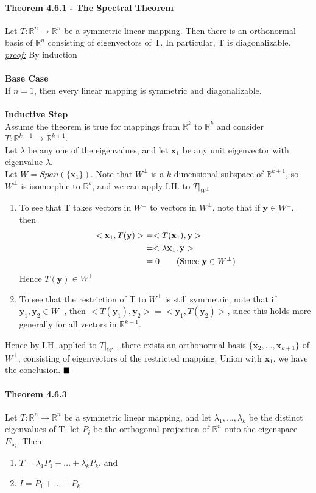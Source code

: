 \documentclass[11pt]{article}
\newcommand{\tb}[1]{\textbf{#1}}
\newcommand{\proof}[0]{\textit{\underline{proof:} }}
\newcommand{\qed}[0]{$\hfill\blacksquare$}
\newcommand{\real}[0]{\mathbb{R}}
\newcommand{\vx}[0]{\tb{x}}
\newcommand{\vy}[0]{\tb{y}}
\begin{document}
{\paragraph{Theorem 4.6.1 - The Spectral Theorem} Let $T: \real^n \rightarrow \real^n$ be a symmetric linear mapping. Then there is an orthonormal basis of $\real^n$ consisting of eigenvectors of T. In particular, T is diagonalizable.\\
\proof By induction\\\\
\tb{Base Case}\\
If $n=1$, then every linear mapping is symmetric and diagonalizable.\\\\
\tb{Inductive Step}\\
Assume the theorem is true for mappings from $\real^k$ to $\real^k$ and consider $T: \real^{k+1} \rightarrow \real^{k+1}$. \\
Let $\lambda$ be any one of the eigenvalues, and let $\vx_1$ be any unit eigenvector with eigenvalue $\lambda$.\\
Let $W = Span(\{\vx_1\})$. Note that $W^\perp$ is a $k$-dimensional subspace of $\real^{k+1}$, so $W^\perp$ is isomorphic to $\real^k$, and we can apply I.H. to $T|_{W^\perp}$
\begin{enumerate}
	\item To see that T takes vectors in $W^\perp$ to vectors in $W^\perp$, note that if $\vy \in W^\perp$, then
	\begin{align*}
		<\vx_1,T(\vy)> &= <T(\vx_1),\vy> \\
		&=<\lambda\vx_1,\vy> \\
		&= 0 \tag{Since $\vy \in W^\perp$}\\
	\end{align*}
	Hence $T(\vy) \in W^\perp$
	\item To see that the restriction of T to $W^\perp$ is still symmetric, note that if $\vy_1, \vy_2 \in W^\perp$, then $<T(\vy_1),\vy_2> = <\vy_1, T(\vy_2)>$, since this holds more generally for all vectors in $\real^{k+1}$.
\end{enumerate}
Hence by I.H. applied to $T|_{W^\perp}$, there exists an orthonormal basis $\{\vx_2,\hdots,\vx_{k+1}\}$ of $W^\perp$, consisting of eigenvectors of the restricted mapping. Union with $\vx_1$, we have the conclusion. \qed

\paragraph{Theorem 4.6.3} Let $T: \real^n \rightarrow \real^n$ be a symmetric linear mapping, and let $\lambda_1,\hdots,\lambda_k$ be the distinct eigenvalues of T. let $P_i$ be the orthogonal projection of $\real^n$ onto the eigenspace $E_{\lambda_i}$. Then
\begin{enumerate}
	\item $T = \lambda_1P_1 + \hdots + \lambda_kP_k$, and
	\item $I = P_1 + \hdots + P_k$
\end{enumerate}
}
\end{document}
